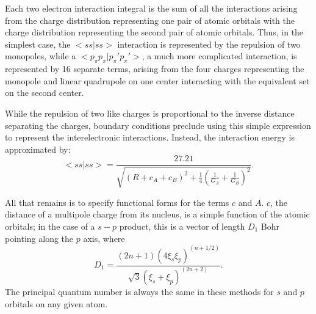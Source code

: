 \documentclass[a4paper]{book}
\begin{document}
Each two electron interaction integral is the sum of all the interactions
arising from the charge distribution representing one pair of atomic orbitals
with the charge distribution representing the second pair of atomic orbitals.
Thus, in the simplest case, the $<ss|ss>$ interaction is represented by the
repulsion of two monopoles, while a $ <p_{\pi} p_{\pi} |p_{\pi} 'p_{\pi} '>$, a
much more complicated interaction, is represented by 16 separate terms, arising
from the four charges representing the monopole and linear quadrupole on one
center interacting with the equivalent set on the second center.

 While the repulsion of two like charges is proportional
to the inverse distance separating the charges, boundary
conditions preclude using this simple expression to
represent the interelectronic interactions. Instead, the
interaction energy is approximated by:
$$
<ss|ss> =\frac{27.21}{\sqrt{(R+c_A+c_B)^2+\frac{1}{4}
(\frac{1}{G_A}+\frac{1}{G_B})^2}}.
$$

All that remains is to specify functional forms for the
terms $c$ and $A$. $c$, the distance of a multipole charge from
its nucleus, is a simple function of the atomic orbitals; in
the case of a $s-p$ product, this is a vector of length $D_1$
Bohr pointing along the $p$ axis, where
$$
D_1 = \frac{(2n+1)(4\xi_s\xi_p)^{(n+1/2)}}{\sqrt{3}(\xi_s+\xi_p)^{(2n+2)}}.
$$
The principal quantum number is always the
same in these methods for $s$ and $p$ orbitals on any given
atom.
\end{document}
